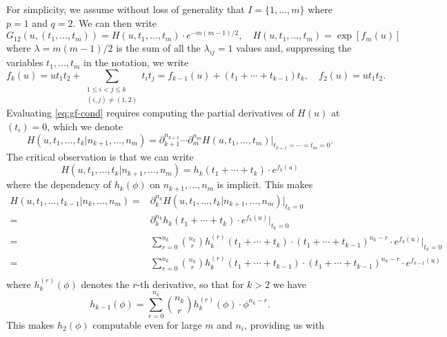 \documentclass{myaptpub}%
\begin{document}
For simplicity, we assume without loss of generality that $I=\{1,\ldots,m\}$ where $p=1$ and $q=2$. We can then write
\begin{equation}\nonumber
G_{12}(u,(t_1,\ldots,t_m))=H(u,t_1,\ldots,t_m)\cdot e^{-m(m-1)/2},\quad
H(u,t_1,\ldots,t_m)=\exp[f_m(u)]
\end{equation}
where $\lambda=m(m-1)/2$ is the sum of all the $\lambda_{ij}=1$ values and, suppressing the variables $t_1,\ldots,t_m$ in the notation, we write
\begin{equation}\nonumber
f_k(u)=ut_1t_2+\sum_{\substack{1\le i<j\le k\\(i,j)\not=(1,2)}}t_it_j
=f_{k-1}(u)+(t_1+\cdots+t_{k-1})t_k,\quad
f_2(u)=ut_1t_2.
\end{equation}
Evaluating \eqref{eq:gf-cond} requires computing the partial derivatives of $H(u)$ at $(t_i)=0$, which we denote
\begin{equation}\nonumber
H(u,t_1,\ldots,t_k|n_{k+1},\ldots,n_m)
=\partial_{k+1}^{n_{k+1}}\cdots\partial_m^{n_m}H(u,t_1,\ldots,t_m)\vert_{t_{k+1}=\cdots=t_m=0}.
\end{equation}
The critical observation is that we can write
\begin{equation}\nonumber
H(u,t_1,\ldots,t_k|n_{k+1},\ldots,n_m)=h_k(t_1+\cdots+t_k)\cdot e^{f_k(u)}
\end{equation}
where the dependency of $h_k(\phi)$ on $n_{k+1},\ldots,n_m$ is implicit. This makes
\begin{equation}\nonumber
\begin{split}
H(u,t_1,\ldots,t_ {k-1}|n_k,\ldots,n_m)
=&\partial_k^{n_k}H(u,t_1,\ldots,t_k|n_{k+1},\ldots,n_m)\vert_{t_k=0}\\
=&\partial_k^{n_k}h_k(t_1+\cdots+t_k)\cdot e^{f_k(u)}\vert_{t_k=0}\\
=&\sum_{r=0}^{n_k}\binom{n_k}{r}h_k^{(r)}(t_1+\cdots+t_k)\cdot(t_1+\cdots+t_{k-1})^{n_k-r}\cdot e^{f_k(u)}\vert_{t_k=0}\\
=&\sum_{r=0}^{n_k}\binom{n_k}{r}h_k^{(r)}(t_1+\cdots+t_{k-1})\cdot(t_1+\cdots+t_{k-1})^{n_k-r}\cdot e^{f_{k-1}(u)}\\
\end{split}
\end{equation}
where $h_k^{(r)}(\phi)$ denotes the $r$-th derivative, so that for $k>2$ we have
\begin{equation}\nonumber
h_{k-1}(\phi)=\sum_{r=0}^{n_k}\binom{n_k}{r} h_k^{(r)}(\phi)\cdot\phi^{n_k-r}.
\end{equation}
This makes $h_2(\phi)$ computable even for large $m$ and $n_i$, providing us with
\end{document}
